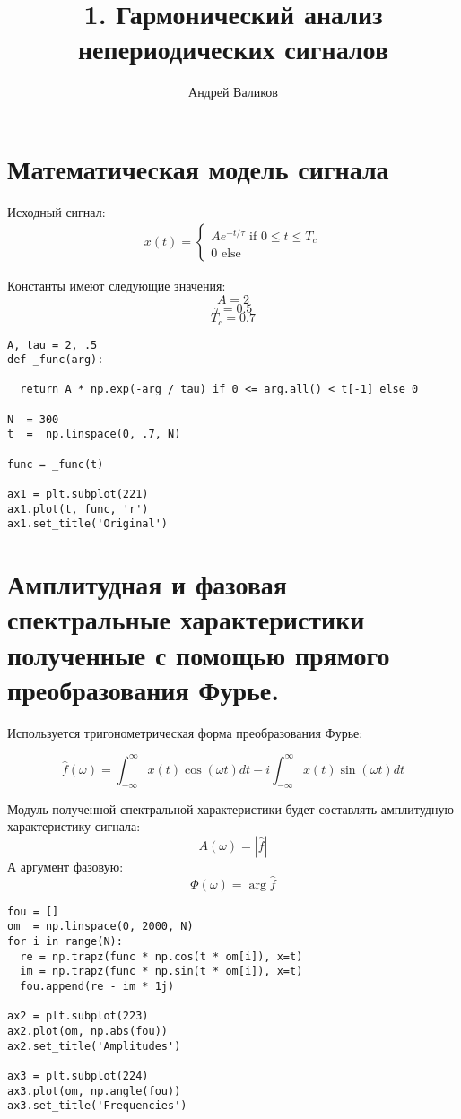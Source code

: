 \documentclass[12pt]{article}
\begin{document}
\title{1. Гармонический анализ непериодических сигналов}
\author{Андрей Валиков}
\date{}
\maketitle

\section{Математическая модель сигнала}
Исходный сигнал:
\begin{gather*}
x(t) = 
\begin{cases}
  Ae^{-t/\tau} \text{ if $0\leq t\leq T_c$}\\
  0 \text{ else}    
\end{cases}
\end{gather*}

\noindent Константы имеют следующие значения:
\[A = 2\]
\[\tau = 0.5\]
\[T_c = 0.7\]

\begin{lstlisting}
A, tau = 2, .5
def _func(arg):

  return A * np.exp(-arg / tau) if 0 <= arg.all() < t[-1] else 0

N  = 300
t  =  np.linspace(0, .7, N)

func = _func(t)

ax1 = plt.subplot(221)
ax1.plot(t, func, 'r')
ax1.set_title('Original')
\end{lstlisting}



\section{Амплитудная и фазовая спектральные характеристики полученные с помощью прямого преобразования Фурье.}
Используется тригонометрическая форма преобразования Фурье:

\[\hat{f}(\omega) = \int_{-\infty}^{\infty}x(t)\cos(\omega t)dt -
 i\int_{-\infty}^{\infty}x(t)\sin(\omega t)dt\]
 
\noindent Модуль полученной спектральной характеристики будет составлять амплитудную характеристику сигнала:
\[A(\omega) = |\hat{f}|\]
А аргумент фазовую:
\[\Phi(\omega) = \arg \hat{f}\]

\begin{lstlisting}
fou = []
om  = np.linspace(0, 2000, N)
for i in range(N):
  re = np.trapz(func * np.cos(t * om[i]), x=t)
  im = np.trapz(func * np.sin(t * om[i]), x=t)
  fou.append(re - im * 1j)

ax2 = plt.subplot(223)
ax2.plot(om, np.abs(fou))
ax2.set_title('Amplitudes')

ax3 = plt.subplot(224)
ax3.plot(om, np.angle(fou))
ax3.set_title('Frequencies')
\end{lstlisting}
\end{document}

